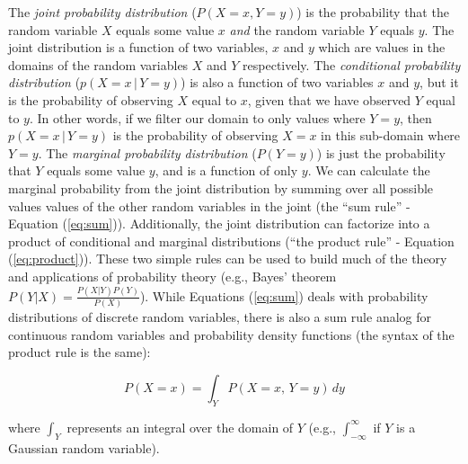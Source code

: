 \documentclass[12pt]{article}
\begin{document}
The \textit{joint probability distribution} ($P(X=x,Y=y)$) is the
probability that the random variable $X$ equals some value $x$
\emph{and} the random variable $Y$ equals $y$. The joint distribution
is a function of two variables, $x$ and $y$ which are values in the
domains of the random variables $X$ and $Y$ respectively. The
\textit{conditional probability distribution} ($p(X = x \, | \, Y=y
)$) is also a function of two variables $x$ and $y$, but it is the
probability of observing $X$ equal to $x$, given that we have observed
$Y$ equal to $y$. In other words, if we filter our domain to only
values where $Y=y$, then $p(X = x \, | \, Y=y )$ is the probability of
observing $X=x$ in this sub-domain where $Y=y$. The \textit{marginal
  probability distribution} ($P(Y=y)$) is just the probability that $Y$
equals some value $y$, and is a function of only $y$. We can calculate
the marginal probability from the joint distribution by summing over
all possible values values of the other random variables in the joint
(the ``sum rule'' - Equation (\ref{eq:sum})). Additionally, the joint
distribution can factorize into a product of conditional and marginal
distributions (``the product rule'' - Equation
(\ref{eq:product})). These two simple rules can be used to build much
of the theory and applications of probability theory (e.g., Bayes'
theorem $P(Y|X) =\frac{P(X|Y) P(Y)}{P(X)}$). While Equations
(\ref{eq:sum}) deals with probability distributions of discrete random
variables, there is also a sum rule analog for continuous random
variables and probability density functions (the syntax of the product
rule is the same):

\begin{equation*} P(X=x) = \int_Y P(X=x,\, Y=y) \, dy
\end{equation*}

where $\int_{Y}$ represents an integral over the domain of $Y$ (e.g.,
$\int_{-\infty}^{\infty}$ if $Y$ is a Gaussian random variable).
\end{document}
